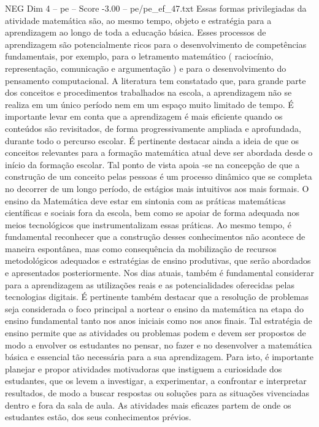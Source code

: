 \begin{textsample}{NEG Dim 4 – pe – Score -3.00 – pe/pe\_ef\_47.txt}
Essas formas privilegiadas da atividade matemática são, ao mesmo tempo, objeto e estratégia para a aprendizagem ao longo de toda a educação básica.
Esses processos de aprendizagem são potencialmente ricos para o desenvolvimento de competências fundamentais, por exemplo, para o letramento matemático ( raciocínio, representação, comunicação e argumentação ) e para o desenvolvimento do pensamento computacional.
A literatura tem constatado que, para grande parte dos conceitos e procedimentos trabalhados na escola, a aprendizagem não se realiza em um único período nem em um espaço muito limitado de tempo.
É importante levar em conta que a aprendizagem é mais eficiente quando os conteúdos são revisitados, de forma progressivamente ampliada e aprofundada, durante todo o percurso escolar.
É pertinente destacar ainda a ideia de que os conceitos relevantes para a formação matemática atual deve ser abordada desde o início da formação escolar.
Tal ponto de vista apoia -se na concepção de que a construção de um conceito pelas pessoas é um processo dinâmico que se completa no decorrer de um longo período, de estágios mais intuitivos aos mais formais.
O ensino da Matemática deve estar em sintonia com as práticas matemáticas científicas e sociais fora da escola, bem como se apoiar de forma adequada nos meios tecnológicos que instrumentalizam essas práticas.
Ao mesmo tempo, é fundamental reconhecer que a construção desses conhecimentos não acontece de maneira espontânea, mas como consequência da mobilização de recursos metodológicos adequados e estratégias de ensino produtivas, que serão abordados e apresentados posteriormente.
Nos dias atuais, também é fundamental considerar para a aprendizagem as utilizações reais e as potencialidades oferecidas pelas tecnologias digitais.
É pertinente também destacar que a resolução de problemas seja considerada o foco principal a nortear o ensino da matemática na etapa do ensino fundamental tanto nos anos iniciais como nos anos finais.
Tal estratégia de ensino permite que as atividades ou problemas podem e devem ser propostos de modo a envolver os estudantes no pensar, no fazer e no desenvolver a matemática básica e essencial tão necessária para a sua aprendizagem.
Para isto, é importante planejar e propor atividades motivadoras que instiguem a curiosidade dos estudantes, que os levem a investigar, a experimentar, a confrontar e interpretar resultados, de modo a buscar respostas ou soluções para as situações vivenciadas dentro e fora da sala de aula.
As atividades mais eficazes partem de onde os estudantes estão, dos seus conhecimentos prévios.

\end{textsample}
